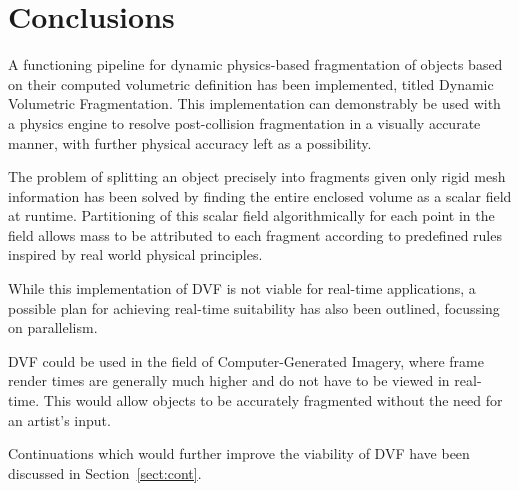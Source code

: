 \null\cleardoublepage
\chapter{Conclusions}

A functioning pipeline for dynamic physics-based fragmentation of objects based on their computed volumetric definition has been implemented, titled Dynamic Volumetric Fragmentation. This implementation can demonstrably be used with a physics engine to resolve post-collision fragmentation in a visually accurate manner, with further physical accuracy left as a possibility.

The problem of splitting an object precisely into fragments given only rigid mesh information has been solved by finding the entire enclosed volume as a scalar field at runtime. Partitioning of this scalar field algorithmically for each point in the field allows mass to be attributed to each fragment according to predefined rules inspired by real world physical principles.

While this implementation of DVF is not viable for real-time applications, a possible plan for achieving real-time suitability has also been outlined, focussing on parallelism.

DVF could be used in the field of Computer-Generated Imagery, where frame render times are generally much higher and do not have to be viewed in real-time. This would allow objects to be accurately fragmented without the need for an artist's input.

Continuations which would further improve the viability of DVF have been discussed in Section~\ref{sect:cont}.

\medskip


